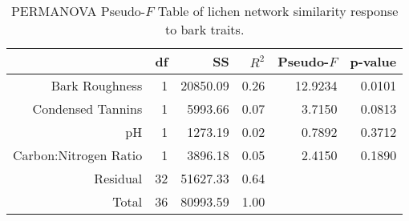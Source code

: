 \begin{table}[ht]
\centering
\begin{tabular}{rrrrrr}
  \hline
 & df & SS & $R^2$ & Pseudo-$F$ & p-value \\ 
  \hline
Bark Roughness & 1 & 20850.09 & 0.26 & 12.9234 & 0.0101 \\ 
  Condensed Tannins & 1 & 5993.66 & 0.07 & 3.7150 & 0.0813 \\ 
  pH & 1 & 1273.19 & 0.02 & 0.7892 & 0.3712 \\ 
  Carbon:Nitrogen Ratio & 1 & 3896.18 & 0.05 & 2.4150 & 0.1890 \\ 
  Residual & 32 & 51627.33 & 0.64 &  &  \\ 
  Total & 36 & 80993.59 & 1.00 &  &  \\ 
   \hline
\end{tabular}
\caption{PERMANOVA Pseudo-$F$ Table of lichen network similarity response to bark traits.} 
\label{tab:cn_trait_perm}
\end{table}
